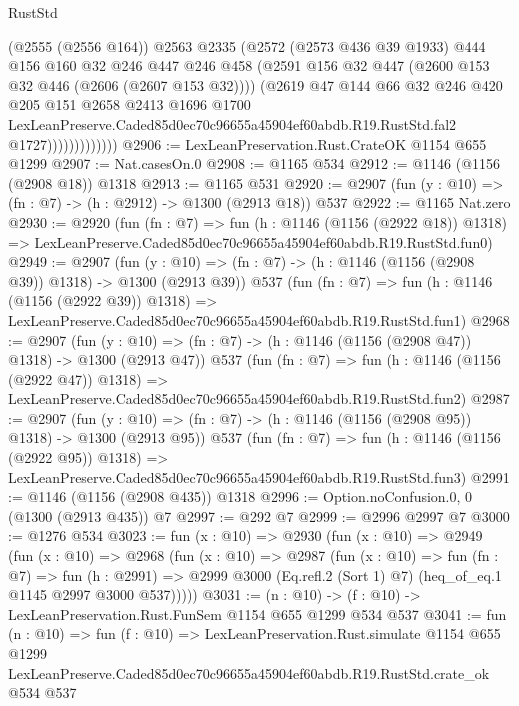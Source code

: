 \begin{lexlean}{RustStd}
\begin{coremodule}
                          (@2555 (@2556 @164))
                          @2563
                          @2335
                          (@2572
                            (@2573 @436 @39 @1933)
                            @444
                            @156
                            @160
                            @32
                            @246
                            @447
                            @246
                            @458
                            (@2591 @156 @32 @447 (@2600 @153 @32 @446 (@2606 (@2607 @153 @32))))
                            (@2619
                              @47
                              @144
                              @66
                              @32
                              @246
                              @420
                              @205
                              @151
                              @2658
                              @2413
                              @1696
                              @1700
                              LexLeanPreserve.Caded85d0ec70c96655a45904ef60abdb.R19.RustStd.fal2
                              @1727)))))))))))))
@2906 := LexLeanPreservation.Rust.CrateOK @1154 @655 @1299
@2907 := Nat.casesOn.{0}
@2908 := @1165 @534
@2912 := @1146 (@1156 (@2908 @18)) @1318
@2913 := @1165 @531
@2920 := @2907 (fun (y : @10) => (fn : @7) -> (h : @2912) -> @1300 (@2913 @18)) @537
@2922 := @1165 Nat.zero
@2930 := @2920
    (fun (fn : @7) =>
    fun (h : @1146 (@1156 (@2922 @18)) @1318) =>
    LexLeanPreserve.Caded85d0ec70c96655a45904ef60abdb.R19.RustStd.fun0)
@2949 := @2907
    (fun (y : @10) => (fn : @7) -> (h : @1146 (@1156 (@2908 @39)) @1318) -> @1300 (@2913 @39))
    @537
    (fun (fn : @7) =>
    fun (h : @1146 (@1156 (@2922 @39)) @1318) =>
    LexLeanPreserve.Caded85d0ec70c96655a45904ef60abdb.R19.RustStd.fun1)
@2968 := @2907
    (fun (y : @10) => (fn : @7) -> (h : @1146 (@1156 (@2908 @47)) @1318) -> @1300 (@2913 @47))
    @537
    (fun (fn : @7) =>
    fun (h : @1146 (@1156 (@2922 @47)) @1318) =>
    LexLeanPreserve.Caded85d0ec70c96655a45904ef60abdb.R19.RustStd.fun2)
@2987 := @2907
    (fun (y : @10) => (fn : @7) -> (h : @1146 (@1156 (@2908 @95)) @1318) -> @1300 (@2913 @95))
    @537
    (fun (fn : @7) =>
    fun (h : @1146 (@1156 (@2922 @95)) @1318) =>
    LexLeanPreserve.Caded85d0ec70c96655a45904ef60abdb.R19.RustStd.fun3)
@2991 := @1146 (@1156 (@2908 @435)) @1318
@2996 := Option.noConfusion.{0, 0} (@1300 (@2913 @435)) @7
@2997 := @292 @7
@2999 := @2996 @2997 @7
@3000 := @1276 @534
@3023 := fun (x : @10) =>
  @2930
    (fun (x : @10) =>
    @2949
      (fun (x : @10) =>
      @2968
        (fun (x : @10) =>
        @2987
          (fun (x : @10) =>
          fun (fn : @7) =>
          fun (h : @2991) =>
          @2999 @3000 (Eq.refl.{2} (Sort 1) @7) (heq_of_eq.{1} @1145 @2997 @3000 @537)))))
@3031 := (n : @10) -> (f : @10) -> LexLeanPreservation.Rust.FunSem @1154 @655 @1299 @534 @537
@3041 := fun (n : @10) =>
  fun (f : @10) =>
  LexLeanPreservation.Rust.simulate
    @1154
    @655
    @1299
    LexLeanPreserve.Caded85d0ec70c96655a45904ef60abdb.R19.RustStd.crate_ok
    @534
    @537
\end{coremodule}
\end{lexlean}
